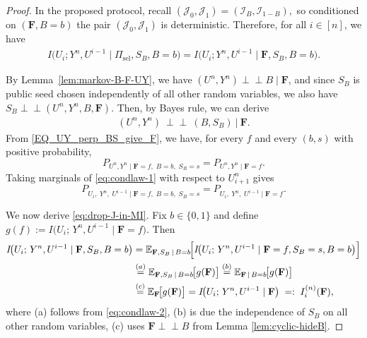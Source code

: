 \documentclass[onecolumn]{IEEEtran} %
\newcommand{\1}{\mathbbm{1}}
\theoremstyle{boldremark}
\newcommand{\pperp}{\mathrel{\perp\!\!\!\perp}}
\begin{document}
\begin{proof}
In the proposed protocol, recall $(\mathcal J_0,\mathcal J_1)=(\mathcal I_B,\mathcal I_{1-B}),$
so conditioned on $(\mathbf F,B=b)$ the pair $(\mathcal J_0,\mathcal J_1)$ is deterministic.
Therefore, for all $i\in[n]$, we have
\begin{align}\label{eq:drop-J-in-MI}
I\!\bigl(U_i;Y^n,U^{i-1}\mid \Pi_{\mathrm{sel}},S_B,B=b\bigr)
=
I\!\bigl(U_i;Y^n,U^{i-1}\mid \mathbf F,S_B,B=b\bigr).
\end{align}

By Lemma~\ref{lem:markov-B-F-UY}, we have
$(U^n,Y^n)\pperp B\mid \mathbf F$, and since $S_B$ is public seed chosen independently of all other random variables,
we also have $S_B\pperp (U^n,Y^n,B,\mathbf F)$. Then, by Bayes rule, we can derive
\begin{align}\label{EQ_UY_perp_BS_give_F}
(U^n,Y^n)\ \pperp\ (B,S_B)\ \big|\ \mathbf F.
\end{align}
From \eqref{EQ_UY_perp_BS_give_F}, we have, for every \(f\) and every \((b,s)\) with positive probability,
\begin{equation}\label{eq:condlaw-1}
P_{U^n,Y^n\mid \mathbf F=f,\;B=b,\;S_B=s}
=
P_{U^n,Y^n\mid \mathbf F=f}.
\end{equation}
Taking marginals of \eqref{eq:condlaw-1} with respect to $U_{i+1}^n$ gives
\begin{equation}\label{eq:condlaw-2}
P_{U_i,\;Y^n,\;U^{i-1}\mid \mathbf F=f,\;B=b,\;S_B=s}
=
P_{U_i,\;Y^n,\;U^{i-1}\mid \mathbf F=f}.
\end{equation}

We now derive \eqref{eq:drop-J-in-MI}. Fix \(b\in\{0,1\}\) and define
\(g(f):=I\!\bigl(U_i;\,Y^n,U^{i-1}\mid \mathbf F=f\bigr)\). Then
\begin{align}
I\!\bigl(U_i;\,Y^n,U^{i-1}\mid \mathbf F,S_B,B=b\bigr)
&=
\mathbb{E}_{\mathbf F,S_B\,\mid\,B=b}\!\Big[
I\!\bigl(U_i;\,Y^n,U^{i-1}\mid \mathbf F=f,S_B=s,B=b\bigr)
\Big]\notag\\
&\overset{(a)}=
\mathbb{E}_{\mathbf F,S_B\,\mid\,B=b}\!\big[g(\mathbf F)\big]
\overset{(b)}=
\mathbb{E}_{\mathbf F\,\mid\,B=b}\!\big[g(\mathbf F)\big]\notag\\
&\overset{(c)}=
\mathbb{E}_{\mathbf F}\!\big[g(\mathbf F)\big]
=
I\!\bigl(U_i;\,Y^n,U^{i-1}\mid \mathbf F\bigr)
\;=:\;
I_i^{(n)}(\mathbf F),
\label{eq:mi-drop-SB}
\end{align}
where (a) follows from \eqref{eq:condlaw-2}, (b) is due the independence of $S_B$ on all other random variables, (c) uses \(\mathbf F\pperp B\) from Lemma \ref{lem:cyclic-hideB}.


\end{proof}
\end{document}
